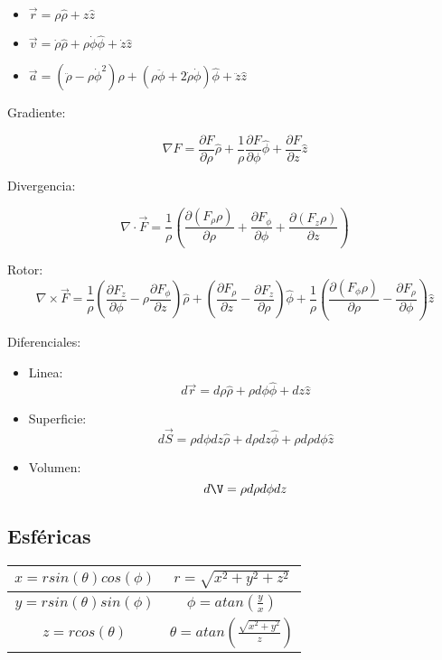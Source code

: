 \begin{itemize}
    \item $\vec{r} = \rho\hat{\rho} + z\hat{z}$
    \item $\vec{v} = \dot{\rho}\hat{\rho} + \rho\dot{\phi}\hat{\phi} + \dot{z}\hat{z}$
    \item $\vec{a} = (\ddot{\rho}-\rho\dot{\phi}^2)\hat{\rho} + (\rho\ddot{\phi}+2\dot{\rho}\dot{\phi})\hat{\phi} + \ddot{z}\hat{z}$
\end{itemize}

\medbreak

Gradiente:

\[\nabla F = \frac{\partial F}{\partial \rho}\hat{\rho} + \frac{1}{\rho}\frac{\partial F}{\partial \phi}\hat{\phi} + \frac{\partial F}{\partial z}\hat{z}\]

Divergencia:

\[\nabla \cdot \vec{F} = \frac{1}{\rho}\left(\frac{\partial(F_{\rho}\rho)}{\partial\rho}+\frac{\partial F_{\phi}}{\partial\phi}+\frac{\partial(F_{z}\rho)}{\partial z}\right)\]

Rotor:
\[\nabla\times\vec{F} = \frac{1}{\rho}\left(\frac{\partial F_{z}}{\partial \phi}-\rho\frac{\partial F_{\phi}}{\partial z}\right)\hat{\rho} + \left(\frac{\partial F_{\rho}}{\partial z}-\frac{\partial F_{z}}{\partial \rho}\right)\hat{\phi} + \frac{1}{\rho}\left(\frac{\partial(F_{\phi}\rho)}{\partial \rho}-\frac{\partial F_{\rho}}{\partial \phi}\right)\hat{z}\]

\medbreak

Diferenciales:

\begin{itemize}
    \item Linea:
    \[d\vec{r} = d\rho\hat{\rho} + \rho d\phi\hat{\phi}+dz\hat{z}\]
    \item Superficie:
    \[d\vec{S} = \rho d\phi dz\hat{\rho}+d\rho dz\hat{\phi}+\rho d\rho d\phi\hat{z}\]
    \item Volumen:
    \[d\V = \rho d\rho d\phi dz\]
\end{itemize}

\newpage

\subsection{Esféricas}

\begin{table}[h]
    \centering
    \begin{tabular}{|c|c|}
        \hline
        $x = rsin(\theta)cos(\phi)$ & $r = \sqrt{x^2 + y^2 + z^2}$ \\
        \hline
        $y = rsin(\theta)sin(\phi)$ & $\phi = atan(\frac{y}{x})$ \\
        \hline
        $z = rcos(\theta)$ & $\theta = atan(\frac{\sqrt{x^2+ y^2}}{z})$ \\
        \hline
    \end{tabular}
\end{table}

